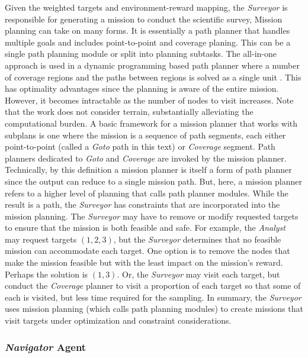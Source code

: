 \documentclass{tamuccthesis}
\begin{document}
Given the weighted targets and environment-reward mapping, the \textit{Surveyor} is responsible for generating a mission to conduct the scientific survey, Mission planning can take on many forms. It is essentially a path planner that handles multiple goals and includes point-to-point and coverage planing. This can be a single path planning module or split into planning subtasks. The all-in-one approach is used in a dynamic programming based path planner where a number of coverage regions and the paths between regions is solved as a single unit \cite{garcia:planner}. This has optimality advantages since the planning is aware of the entire mission. However, it becomes intractable as the number of nodes to visit increases. Note that the work does not consider terrain, substantially alleviating the computational burden. A basic framework for a mission planner that works with subplans is one where the mission is a sequence of path segments, each either point-to-point (called a \textit{Goto} path in this text) or \textit{Coverage} segment. Path planners dedicated to \textit{Goto} and \textit{Coverage} are invoked by the mission planner. Technically, by this definition a mission planner is itself a form of path planner since the output can reduce to a single mission path. But, here, a mission planner refers to a higher level of planning that calls path planner modules. While the result is a path, the \textit{Surveyor} has constraints that are incorporated into the mission planning. The \textit{Surveyor} may have to remove or modify requested targets to ensure that the mission is both feasible and safe. For example, the \textit{Analyst} may request targets $(1, 2, 3)$, but the \textit{Surveyor} determines that no feasible mission can accommodate each target. One option is to remove the nodes that make the mission feasible but with the least impact on the mission's reward. Perhaps the solution is $(1, 3)$. Or, the \textit{Surveyor} may visit each target, but conduct the \textit{Coverage} planner to visit a proportion of each target so that some of each is visited, but less time required for the sampling. In summary, the \textit{Surveyor} uses mission planning (which calls path planning modules) to create missions that visit targets under optimization and constraint considerations. 

\subsubsection{\textit{\textit{Navigator}} Agent}
\end{document}
